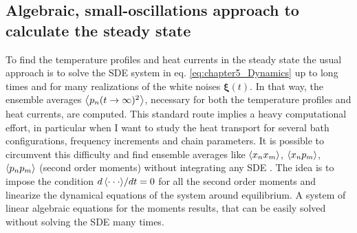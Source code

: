 \subsection{Algebraic, small-oscillations approach to calculate the steady state\label{sec:chapter5_steadyState}}
%
%
%
%
To find the temperature profiles and heat currents in the steady state the usual approach is to solve the SDE system in eq. \eqref{eq:chapter5_Dynamics} up to long times  and for many realizations of the white noises $\bm\xi (t)$. In that way, the ensemble averages $\expval{p_n(t \to \infty)^2}$, necessary for both the temperature profiles and heat currents, are computed. This standard route implies a heavy computational effort, in particular  when I want to study the heat transport for several bath configurations, frequency increments and chain parameters. It is possible to circumvent this difficulty and find ensemble averages like $\expval{x_n x_m}$, $\expval{x_n p_m}$, $\expval{p_n p_m}$ (second order moments) without integrating any SDE \cite{Sarkka2019,Rieder1967,Casher1971}. The idea is to impose the condition ${d\expval{\cdot\cdot\cdot}}/{dt} = 0$ for all the second order moments and linearize the dynamical equations of the system around equilibrium.
A system of linear algebraic equations for the moments results, that can be easily solved without solving the SDE many times.

